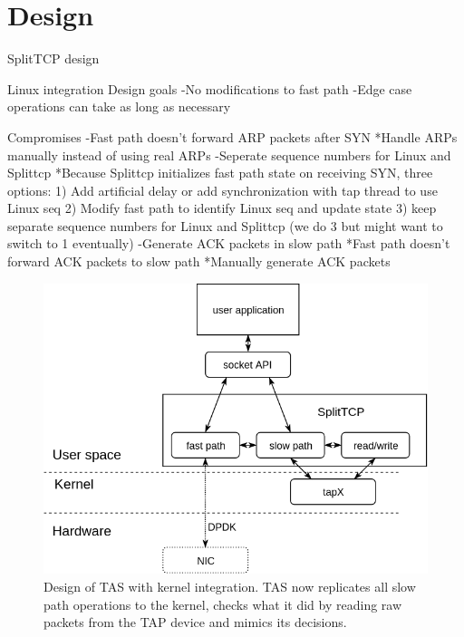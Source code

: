 \section{Design}\label{Design}

SplitTCP design

Linux integration Design goals
 -No modifications to fast path
 -Edge case operations can take as long as necessary

Compromises
 -Fast path doesn't forward ARP packets after SYN
	*Handle ARPs manually instead of using real ARPs
 -Seperate sequence numbers for Linux and Splittcp
    *Because Splittcp initializes fast path state on receiving SYN, three options:
		1) Add artificial delay or add synchronization with tap thread to use Linux seq
		2) Modify fast path to identify Linux seq and update state
		3) keep separate sequence numbers for Linux and Splittcp
		(we do 3 but might want to switch to 1 eventually)
 -Generate ACK packets in slow path
	*Fast path doesn't forward ACK packets to slow path
	*Manually generate ACK packets

\begin{figure}
\centering
\includegraphics[width=0.7\columnwidth]{figures/splittcp.png}
\caption{Design of TAS with kernel integration. TAS now replicates all slow path operations to the kernel, checks what
it did by reading raw packets from the TAP device and mimics its decisions.}
\label{fig:splittcp_tap}
\end{figure}